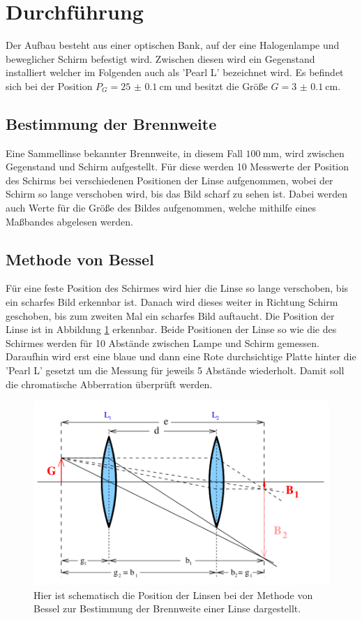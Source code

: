 \section{Durchführung}
\label{sec:Durchführung}
Der Aufbau besteht aus einer optischen Bank, auf der eine Halogenlampe und beweglicher Schirm befestigt wird. 
Zwischen diesen wird ein Gegenstand installiert welcher im Folgenden auch als 'Pearl L' bezeichnet wird.
Es befindet sich bei der Position $P_G=\qty{25(0.1)}{\centi\meter}$ und besitzt die Größe $G=\qty{3(0.1)}{\centi\meter}$.

\subsection{Bestimmung der Brennweite}
Eine Sammellinse bekannter Brennweite, in diesem Fall $\qty{100}{\milli\meter}$, wird zwischen Gegenstand und Schirm aufgestellt.
Für diese werden 10 Messwerte der Position des Schirms bei verschiedenen Positionen der Linse aufgenommen, wobei der Schirm so lange verschoben wird, bis das Bild scharf zu sehen ist.
Dabei werden auch Werte für die Größe des Bildes aufgenommen, welche mithilfe eines Maßbandes abgelesen werden.

\subsection{Methode von Bessel}
Für eine feste Position des Schirmes wird hier die Linse so lange verschoben, bis ein scharfes Bild erkennbar ist. 
Danach wird dieses weiter in Richtung Schirm geschoben, bis zum zweiten Mal ein scharfes Bild auftaucht.
Die Position der Linse ist in Abbildung \ref{fig:Bessel} erkennbar.
Beide Positionen der Linse so wie die des Schirmes werden für 10 Abstände zwischen Lampe und Schirm gemessen.
Daraufhin wird erst eine blaue und dann eine Rote durchsichtige Platte hinter die 'Pearl L' gesetzt um die Messung für jeweils 5 Abstände wiederholt.
Damit soll die chromatische Abberration überprüft werden.

\begin{figure}[H]
    \includegraphics{Bilder/Bessel.png}
    \centering
    \caption{Hier ist schematisch die Position der Linsen bei der Methode von Bessel zur Bestimmung der Brennweite einer Linse dargestellt. \cite{V408}}
    \label{fig:Bessel}
\end{figure}


